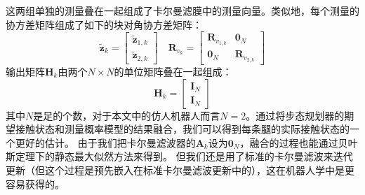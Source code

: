 这两组单独的测量叠在一起组成了卡尔曼滤膜中的测量向量。类似地，每个测量的协方差矩阵组成了如下的块对角协方差矩阵：
\begin{equation}
    \label{equ:est_h_and_f}
    \tilde{\boldsymbol{z}}_k=\left[\begin{array}{c}
        \tilde{\boldsymbol{z}}_{1, k} \\
        \tilde{\boldsymbol{z}}_{2, k}
        \end{array}\right] \quad \boldsymbol{R}_{v_k}=\left[\begin{array}{cc}
        \boldsymbol{R}_{v_{1, k}} & \mathbf{0}_N \\
        \mathbf{0}_N & \boldsymbol{R}_{v_{2, k}}
        \end{array}\right]
\end{equation}
输出矩阵$\boldsymbol{H}_k$由两个$N\times N$的单位矩阵叠在一起组成：
\begin{equation}
    \label{equ:output_matrix}
    \boldsymbol{H}_k=\left[\begin{array}{l}
        \mathbf{I}_N \\
        \mathbf{I}_N
        \end{array}\right]
\end{equation}
其中$N$是足的个数，对于本文中的仿人机器人而言$N=2$。通过将步态规划器的期望接触状态和测量概率模型的结果融合，我们可以得到每条腿的实际接触状态的一个更好的估计。
由于我们把卡尔曼滤波器的$\boldsymbol{A}_k$设为$\mathbf{0}_N$，融合的过程也能通过贝叶斯定理下的静态最大似然方法来得到。
但我们还是用了标准的卡尔曼滤波来迭代更新（但这个过程是预先嵌入在标准卡尔曼滤波更新中的），这在机器人学中是更容易获得的。
